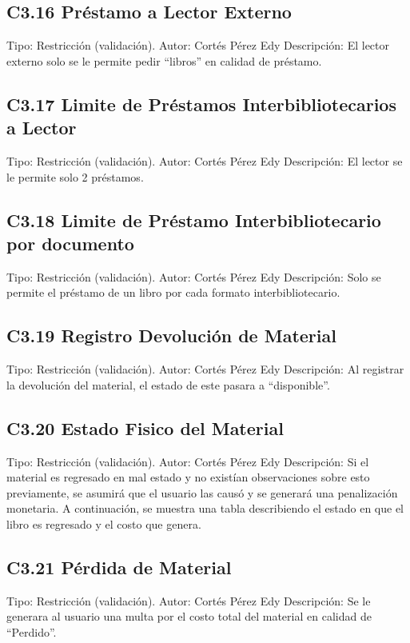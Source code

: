 \subsection{C3.16 Préstamo a Lector Externo }
	\UCli Tipo: Restricción (validación).
	\UCli Autor: Cortés Pérez Edy
	\UCli Descripción: El lector externo solo se le permite pedir “libros” en calidad de préstamo. 
	
\subsection{C3.17 Limite de Préstamos Interbibliotecarios a Lector }
	\UCli Tipo: Restricción (validación).
	\UCli Autor: Cortés Pérez Edy
	\UCli Descripción: El lector se le permite solo 2 préstamos.
	
\subsection{C3.18 Limite de Préstamo Interbibliotecario por documento }
	\UCli Tipo: Restricción (validación).
	\UCli Autor: Cortés Pérez Edy
	\UCli Descripción: Solo se permite el préstamo de un libro por cada formato interbibliotecario.
	
\subsection{C3.19 Registro Devolución de Material }
	\UCli Tipo: Restricción (validación).
	\UCli Autor: Cortés Pérez Edy
	\UCli Descripción: Al registrar la devolución del material, el estado de este pasara a “disponible”.
	
\subsection{C3.20 Estado Fisico del Material }
	\UCli Tipo: Restricción (validación).
	\UCli Autor: Cortés Pérez Edy
	\UCli Descripción: Si el material es regresado en mal estado y no existían observaciones sobre esto previamente, se asumirá que el usuario las causó y se generará una penalización monetaria. A continuación, se muestra una tabla describiendo el estado en que el libro es regresado y el costo que genera.
	
\subsection{C3.21 Pérdida de Material }
	\UCli Tipo: Restricción (validación).
	\UCli Autor: Cortés Pérez Edy
	\UCli Descripción: Se le generara al usuario una multa por el costo total del material en calidad de “Perdido”.
	

